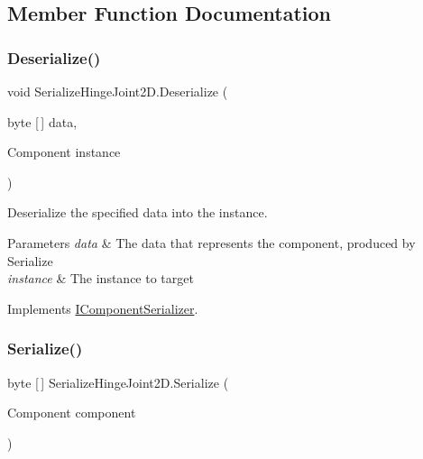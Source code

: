 \subsection{Member Function Documentation}
\mbox{\label{class_serialize_hinge_joint2_d_aad33e878c1b722e388f05fe1892157e8}} 
\subsubsection{\texorpdfstring{Deserialize()}{Deserialize()}}
{\footnotesize\ttfamily void Serialize\+Hinge\+Joint2\+D.\+Deserialize (\begin{DoxyParamCaption}\item[{byte \mbox{[}$\,$\mbox{]}}]{data,  }\item[{Component}]{instance }\end{DoxyParamCaption})\hspace{0.3cm}{\ttfamily [inline]}}



Deserialize the specified data into the instance. 


\begin{DoxyParams}{Parameters}
{\em data} & The data that represents the component, produced by Serialize \\
\hline
{\em instance} & The instance to target \\
\hline
\end{DoxyParams}


Implements \hyperlink{interface_i_component_serializer_a4cc366a5c78b33d47a90c209d8fed883}{I\+Component\+Serializer}.

\mbox{\label{class_serialize_hinge_joint2_d_a1e2a66811e08e2e87ea97ca28b65b844}} 
\subsubsection{\texorpdfstring{Serialize()}{Serialize()}}
{\footnotesize\ttfamily byte \mbox{[}$\,$\mbox{]} Serialize\+Hinge\+Joint2\+D.\+Serialize (\begin{DoxyParamCaption}\item[{Component}]{component }\end{DoxyParamCaption})\hspace{0.3cm}{\ttfamily [inline]}}



